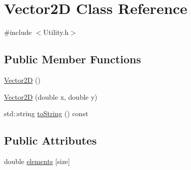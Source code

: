 \hypertarget{class_vector2_d}{\section{Vector2\-D Class Reference}
\label{class_vector2_d}
}


{\ttfamily \#include $<$Utility.\-h$>$}

\subsection*{Public Member Functions}
\begin{DoxyCompactItemize}
\item 
\hyperlink{class_vector2_d_a98e9997ebb7a629f4db52397d4e0d653}{Vector2\-D} ()
\item 
\hyperlink{class_vector2_d_a525e125aac4c844f04c52ddb0e75d594}{Vector2\-D} (double x, double y)
\item 
std\-::string \hyperlink{class_vector2_d_a3a5733c80b717c907b43b755e94625ef}{to\-String} () const 
\end{DoxyCompactItemize}
\subsection*{Public Attributes}
\begin{DoxyCompactItemize}
\item 
double \hyperlink{class_vector2_d_a3bdf405eacce2d6efe0ea3d9b80bede5}{elements} \mbox{[}size\mbox{]}
\end{DoxyCompactItemize}



